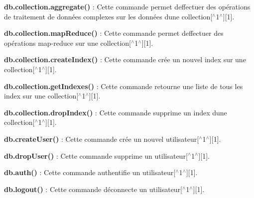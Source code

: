 \begin{DoxyItemize}
\item {\bfseries db.\+collection.\+aggregate()} \+: Cette commande permet d\textquotesingle{}effectuer des opérations de traitement de données complexes sur les données d\textquotesingle{}une collection\mbox{[}$^\wedge$1$^\wedge$\mbox{]}\mbox{[}1\mbox{]}.
\item {\bfseries db.\+collection.\+map\+Reduce()} \+: Cette commande permet d\textquotesingle{}effectuer des opérations map-\/reduce sur une collection\mbox{[}$^\wedge$1$^\wedge$\mbox{]}\mbox{[}1\mbox{]}.
\item {\bfseries db.\+collection.\+create\+Index()} \+: Cette commande crée un nouvel index sur une collection\mbox{[}$^\wedge$1$^\wedge$\mbox{]}\mbox{[}1\mbox{]}.
\item {\bfseries db.\+collection.\+get\+Indexes()} \+: Cette commande retourne une liste de tous les index sur une collection\mbox{[}$^\wedge$1$^\wedge$\mbox{]}\mbox{[}1\mbox{]}.
\item {\bfseries db.\+collection.\+drop\+Index()} \+: Cette commande supprime un index d\textquotesingle{}une collection\mbox{[}$^\wedge$1$^\wedge$\mbox{]}\mbox{[}1\mbox{]}.
\item {\bfseries db.\+create\+User()} \+: Cette commande crée un nouvel utilisateur\mbox{[}$^\wedge$1$^\wedge$\mbox{]}\mbox{[}1\mbox{]}.
\item {\bfseries db.\+drop\+User()} \+: Cette commande supprime un utilisateur\mbox{[}$^\wedge$1$^\wedge$\mbox{]}\mbox{[}1\mbox{]}.
\item {\bfseries db.\+auth()} \+: Cette commande authentifie un utilisateur\mbox{[}$^\wedge$1$^\wedge$\mbox{]}\mbox{[}1\mbox{]}.
\item {\bfseries db.\+logout()} \+: Cette commande déconnecte un utilisateur\mbox{[}$^\wedge$1$^\wedge$\mbox{]}\mbox{[}1\mbox{]}. 
\end{DoxyItemize}